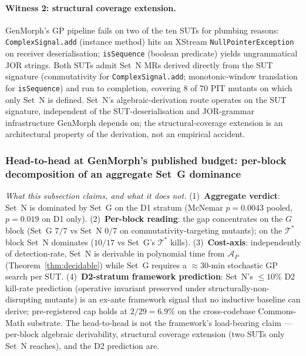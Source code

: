 \documentclass[acmsmall, screen]{acmart}
\begin{document}
\paragraph{Witness 2: structural coverage extension.}
GenMorph's GP pipeline fails on two of the ten SUTs for plumbing reasons: \texttt{ComplexSignal.add} (instance method) hits an XStream \texttt{NullPointerException} on receiver deserialisation; \texttt{isSequence} (boolean predicate) yields ungrammatical JOR strings. Both SUTs admit Set~N MRs derived directly from the SUT signature (commutativity for \texttt{ComplexSignal.add}; monotonic-window translation for \texttt{isSequence}) and run to completion, covering 8 of 70 PIT mutants on which only Set~N is defined. Set~N's algebraic-derivation route operates on the SUT signature, independent of the SUT-deserialisation and JOR-grammar infrastructure GenMorph depends on; the structural-coverage extension is an architectural property of the derivation, not an empirical accident.

\subsubsection{Head-to-head at GenMorph's published budget: per-block decomposition of an aggregate Set~G dominance}
\label{subsec:pooled-headtohead}

\begin{tcolorbox}[colback=gray!5,colframe=black!50,arc=2pt,boxrule=0.5pt,fontupper=\small,title=Boundary of contribution (head-to-head restatement),fonttitle=\small\bfseries]
\textit{What this subsection claims, and what it does not.} (1)~\textbf{Aggregate verdict}: Set~N is dominated by Set~G on the D1 stratum (McNemar $p = 0.0043$ pooled, $p = 0.019$ on D1 only). (2)~\textbf{Per-block reading}: the gap concentrates on the $G$ block (Set~G $7/7$ vs Set~N $0/7$ on commutativity-targeting mutants); on the $\mathcal{T}^{*}$ block Set~N dominates ($10/17$ vs Set~G's $\mathcal{T}^{*}$ kills). (3)~\textbf{Cost-axis}: independently of detection-rate, Set~N is derivable in polynomial time from $\mathcal{A}_P$ (Theorem~\ref{thm:decidable}) while Set~G requires a $\approx 30$-min stochastic GP search per SUT. (4)~\textbf{D2-stratum framework prediction}: Set~N's $\le 10\%$ D2 kill-rate prediction (operative invariant preserved under structurally-non-disrupting mutants) is an ex-ante framework signal that no inductive baseline can derive; pre-registered cap holds at $2/29 = 6.9\%$ on the cross-codebase Commons-Math substrate. The head-to-head is not the framework's load-bearing claim --- per-block algebraic derivability, structural coverage extension (two SUTs only Set~N reaches), and the D2 prediction are.
\end{tcolorbox}
\end{document}

